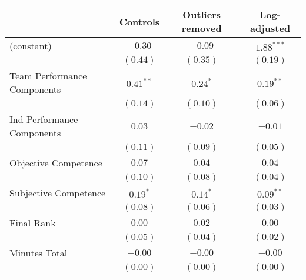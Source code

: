
\begin{table}
\begin{center}
\begin{tabular}{l c c c }
\toprule
 & Controls & Outliers removed & Log-adjusted \\
\midrule
(constant)                                                & $-0.30$              & $-0.09$             & $\mathbf{1.88}^{***}$ \\
                                                          & $(0.44)$             & $(0.35)$            & $(0.19)$              \\
Team Performance Components                               & $\mathbf{0.41}^{**}$ & $\mathbf{0.24}^{*}$ & $\mathbf{0.19}^{**}$  \\
                                                          & $(0.14)$             & $(0.10)$            & $(0.06)$              \\
Ind Performance Components                                & $0.03$               & $-0.02$             & $-0.01$               \\
                                                          & $(0.11)$             & $(0.09)$            & $(0.05)$              \\
Objective Competence                                      & $0.07$               & $0.04$              & $0.04$                \\
                                                          & $(0.10)$             & $(0.08)$            & $(0.04)$              \\
Subjective Competence                                     & $\mathbf{0.19}^{*}$  & $\mathbf{0.14}^{*}$ & $\mathbf{0.09}^{**}$  \\
                                                          & $(0.08)$             & $(0.06)$            & $(0.03)$              \\
Final Rank                                                & $0.00$               & $0.02$              & $0.00$                \\
                                                          & $(0.05)$             & $(0.04)$            & $(0.02)$              \\
Minutes Total                                             & $-0.00$              & $-0.00$             & $-0.00$               \\
                                                          & $(0.00)$             & $(0.00)$            & $(0.00)$              \\

\end{tabular}
\end{center}
\end{table}
